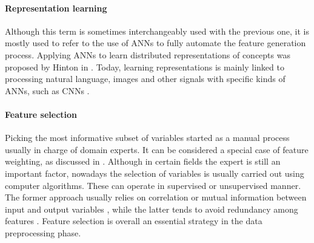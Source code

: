     \paragraph{Representation learning }
    Although this term is sometimes interchangeably used with the previous one, it is mostly used to refer to the use of ANNs to fully automate the feature generation process. Applying ANNs to learn distributed representations of concepts was proposed by Hinton in . Today, learning representations is mainly linked to processing natural language, images and other signals with specific kinds of ANNs, such as CNNs .
  
    \paragraph{Feature selection } 
    Picking the most informative subset of variables started as a manual process usually in charge of domain experts. It can be considered a special case of feature weighting, as discussed in . Although in certain fields the expert is still an important factor, nowadays the selection of variables is usually carried out using computer algorithms. These can operate in supervised or unsupervised manner. The former approach usually relies on correlation or mutual information between input and output variables , while the latter tends to avoid redundancy among features . Feature selection is overall an essential strategy in the data preprocessing  phase.
    
